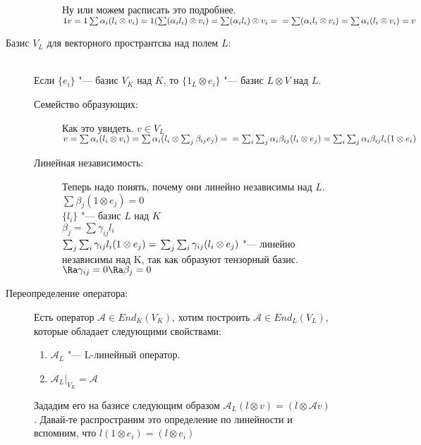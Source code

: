 \begin{description}
\begin{description}
\begin{description}
Ну или можем расписать это подробнее.
$1v = 1\sum \alpha_i(l_i \otimes v_i) = \\
1(\sum (\alpha_i l_i) \otimes v_i) = \sum(\alpha_i l_i)\otimes v_i  =\\
= \sum(\alpha_i l_i \otimes v_i) = \sum \alpha_i(l_i \otimes v_i) = v$

    \end{description}
    \item[Базис $V_L$ для векторного пространтсва над полем $L$:] \hfill \\
Если $\{e_i\}$ "--- базис $V_K$ над $K$, то
$\{1_L \otimes e_i\}$ "--- базис $L \otimes V$ над $L$.
     \begin{description}
     \item[Семейство образующих:]
Как это увидеть. 
$v \in V_L$\\
$v = \sum \alpha_i(l_i \otimes v_i) = \sum \alpha_i(l_i \otimes \sum_{j}\beta_{ij}e_j) = \\
 = \sum_{i}\sum_{j}\alpha_i \beta_{ij} (l_i \otimes e_j) = \sum_{i}\sum_{j}\alpha_i \beta_{ij}l_i(1 \otimes e_i)$\\

     \item[Линейная независимость:]
Теперь надо понять, почему они линейно независимы над $L$.
$\sum \beta_{j}(1 \otimes e_j) = 0$\\
$\{l_i\}$ "--- базис $L$ над $K$\\
$\beta_j = \sum \gamma_{ij}l_i$\\
$\sum_j \sum_i \gamma_{ij}l_i(1 \otimes e_j) =\\ 
\sum_j \sum_i \gamma_{ij}(l_i \otimes e_j)$  "--- линейно независимы над K, так как образуют тензорный базис.
$\Ra \gamma_{ij} = 0 \Ra \beta_j = 0$\\
 
    \end{description}
    \item[Переопределение оператора:]
Есть оператор $\mathcal{A} \in End_K(V_K)$, хотим построить $\mathcal{A} \in End_L(V_L)$, 
которые обладает следующими свойствами:
\begin{enumerate}
\item
$\mathcal{A}_L$ "--- L-линейный оператор.
\item 
$\mathcal{A}_L|_{V_K} = \mathcal{A}$
\end{enumerate}

Зададим его на базисе следующим образом $\mathcal{A}_L(l \otimes v) = (l \otimes \mathcal{A}v)$.
Давай-те распространим это определение по линейности и вспомним, что $l(1 \otimes e_i) = (l \otimes e_i)$\\ 


\end{description}
\end{description}
